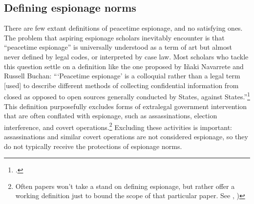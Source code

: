 \documentclass[12pt]{extarticle}
\begin{document}


\subsection{Defining espionage norms}
There are few extant definitions of peacetime espionage, and no satisfying ones. The problem that aspiring espionage scholars inevitably encounter is that \enquote{peacetime espionage} is universally understood as a term of art but almost never defined by legal codes, or interpreted by case law. Most scholars who tackle this question settle on a definition like the one proposed by I\~{n}aki Navarrete and Russell Buchan: \enquote{\enquote{Peacetime espionage} is a colloquial rather than a legal term [used] to describe different methods of collecting confidential information from closed as opposed to open sources \textelp{} generally conducted by States, against States.}\footcite[901-902]{navarrete_out_2019} This definition purposefully excludes forms of extralegal government intervention that are often conflated with espionage, such as assassinations, election interference, and covert operations.\footnote{Often papers won't take a stand on defining espionage, but rather offer a working definition just to bound the scope of that particular paper. See \cite[600]{radsan_unresolved_2007}, \cite[2]{kapp_spying_2007})} Excluding these activities is important: assassinations and similar covert operations are not considered espionage, so they do not typically receive the protections of espionage norms.
\end{document}
